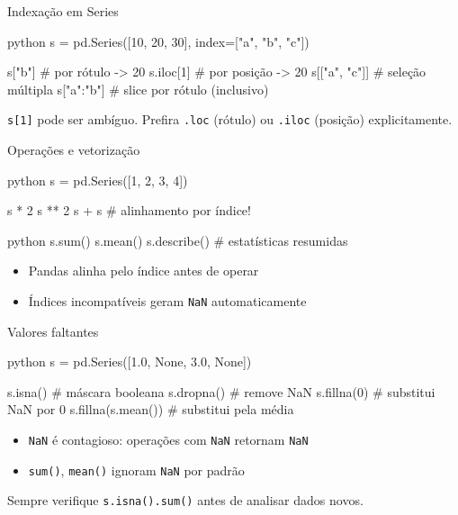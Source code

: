 \documentclass[xcolor=dvipsnames,t,aspectratio=169]{beamer}
\newcommand{\highlight}[1]{{\color{nes_dark_orange} #1}}
\begin{document}
\begin{frame}[c, fragile]{Indexação em Series}

\begin{code}{python}
s = pd.Series([10, 20, 30], index=["a", "b", "c"])

s["b"]          # por rótulo  -> 20
s.iloc[1]       # por posição -> 20
s[["a", "c"]]   # seleção múltipla
s["a":"b"]      # slice por rótulo (inclusivo)
\end{code}

\begin{display}[Atenção]
\texttt{s[1]} pode ser ambíguo. Prefira \texttt{.loc} (rótulo) ou \texttt{.iloc} (posição) explicitamente.
\end{display}

\end{frame}


\begin{frame}[c, fragile]{Operações e vetorização}

\begin{code}{python}
s = pd.Series([1, 2, 3, 4])

s * 2
s ** 2
s + s           # alinhamento por índice!
\end{code}

\begin{code}{python}
s.sum()
s.mean()
s.describe()    # estatísticas resumidas
\end{code}

\begin{itemize}
    \item Pandas \highlight{alinha pelo índice} antes de operar
    \item Índices incompatíveis geram \texttt{NaN} automaticamente
\end{itemize}

\end{frame}


\begin{frame}[c, fragile]{Valores faltantes}

\begin{code}{python}
s = pd.Series([1.0, None, 3.0, None])

s.isna()            # máscara booleana
s.dropna()          # remove NaN
s.fillna(0)         # substitui NaN por 0
s.fillna(s.mean())  # substitui pela média
\end{code}

\begin{itemize}
    \item \texttt{NaN} é \highlight{contagioso}: operações com \texttt{NaN} retornam \texttt{NaN}
    \item \texttt{sum()}, \texttt{mean()} ignoram \texttt{NaN} por padrão
\end{itemize}

\begin{display}
Sempre verifique \texttt{s.isna().sum()} antes de analisar dados novos.
\end{display}

\end{frame}
\end{document}
